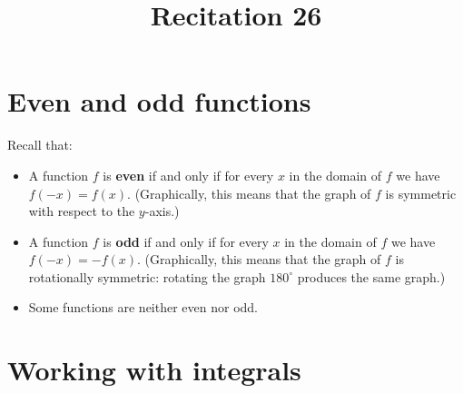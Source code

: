 \documentclass[nooutcomes, handout]{ximera}
\title{Recitation 26}
\begin{document}
\begin{abstract}		\end{abstract}
\maketitle

\section{Even and odd functions}
Recall that:
\begin{itemize}
  \item 
    A function $f$ is \textbf{even} if and only if for every $x$ in the domain of $f$ we have $f(-x) = f(x)$.
    (Graphically, this means that the graph of $f$ is symmetric with respect to the $y$-axis.)

  \item 
    A function $f$ is \textbf{odd} if and only if for every $x$ in the domain of $f$ we have $f(-x) = -f(x)$.
   (Graphically, this means that the graph of $f$ is rotationally symmetric: rotating the graph $180^\circ$ produces the same graph.)

 \item 
   Some functions are neither even nor odd.
\end{itemize}

\section{Working with integrals}
\end{document}
